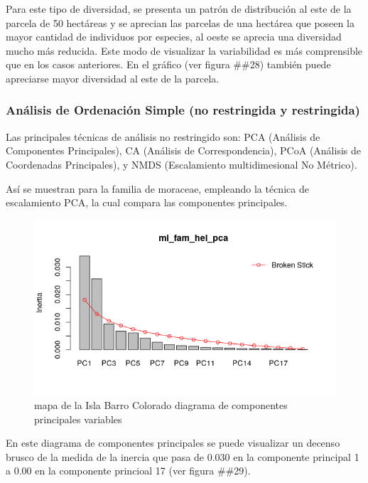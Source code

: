 \documentclass[11pt,]{article}
\begin{document}
Para este tipo de diversidad, se presenta un patrón de distribución al
este de la parcela de 50 hectáreas y se aprecian las parcelas de una
hectárea que poseen la mayor cantidad de individuos por especies, al
oeste se aprecia una diversidad mucho más reducida. Este modo de
visualizar la variabilidad es más comprensible que en los casos
anteriores. En el gráfico (ver figura \#\#28) también puede apreciarse
mayor diversidad al este de la parcela.

\subsubsection{Análisis de Ordenación Simple (no restringida y
restringida)}\label{anuxe1lisis-de-ordenaciuxf3n-simple-no-restringida-y-restringida}

Las principales técnicas de análisis no restringido son: PCA (Análisis
de Componentes Principales), CA (Análisis de Correspondencia), PCoA
(Análisis de Coordenadas Principales), y NMDS (Escalamiento
multidimesional No Métrico).

Así se muestran para la familia de moraceae, empleando la técnica de
escalamiento PCA, la cual compara las componentes principales.

\begin{figure}
\centering
\includegraphics[width=1.00000\textwidth]{mi_fam_hel_pca.png}
\caption{mapa de la Isla Barro Colorado diagrama de componentes
principales variables\label{fig:bci_map}}
\end{figure}

En este diagrama de componentes principales se puede visualizar un
decenso brusco de la medida de la inercia que pasa de 0.030 en la
componente principal 1 a 0.00 en la componente princioal 17 (ver figura
\#\#29).
\end{document}
